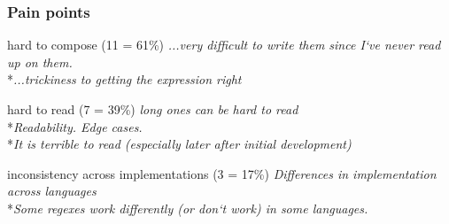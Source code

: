 %
%
%
%
%
%
%

\begin{frame}
\frametitle{Pain points}
\begin{block}{hard to compose (11 = 61\%)}
\emph{...very difficult to write them since I`ve never read up on them.}
\\*\emph{...trickiness to getting the expression right}
\end{block}
\begin{block}{hard to read (7 = 39\%)}
\emph{long ones can be hard to read}
\\*\emph{Readability. Edge cases.}
\\*\emph{It is terrible to read (especially later after initial development) }
\end{block}
\begin{block}{inconsistency across implementations (3 = 17\%)}
\emph{Differences in implementation across languages}
\\*\emph{Some regexes work differently (or don`t work) in some languages.}
\end{block}
\end{frame}

